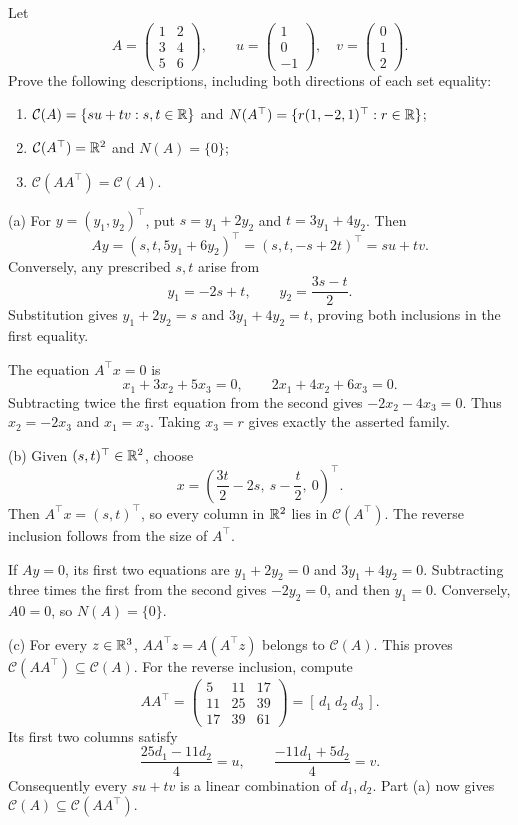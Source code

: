 \begin{problem}\label{ex:01:concrete-column-null-sets}
Let
\[
A=\begin{pmatrix}1&2\\3&4\\5&6\end{pmatrix},
\qquad
u=\begin{pmatrix}1\\0\\-1\end{pmatrix},
\quad v=\begin{pmatrix}0\\1\\2\end{pmatrix}.
\]
Prove the following descriptions, including both directions of each
set equality:
\begin{enumerate}
\item $\mathcal C(A)=\{su+tv:s,t\in\mathbb R\}$ and
$N(A^\top)=\{r(1,-2,1)^\top:r\in\mathbb R\}$;
\item $\mathcal C(A^\top)=\mathbb R^2$ and $N(A)=\{0\}$;
\item $\mathcal C(AA^\top)=\mathcal C(A)$.
\end{enumerate}
\end{problem}
\begin{solution}
(a) For $y=(y_1,y_2)^\top$, put
$s=y_1+2y_2$ and $t=3y_1+4y_2$. Then
\[
Ay=(s,t,5y_1+6y_2)^\top=(s,t,-s+2t)^\top=su+tv.
\]
Conversely, any prescribed $s,t$ arise from
\[
y_1=-2s+t,\qquad y_2=\frac{3s-t}{2}.
\]
Substitution gives $y_1+2y_2=s$ and $3y_1+4y_2=t$, proving both
inclusions in the first equality.

The equation $A^\top x=0$ is
\[
x_1+3x_2+5x_3=0,\qquad 2x_1+4x_2+6x_3=0.
\]
Subtracting twice the first equation from the second gives
$-2x_2-4x_3=0$. Thus $x_2=-2x_3$ and $x_1=x_3$.
Taking $x_3=r$ gives exactly the asserted family.

(b) Given $(s,t)^\top\in\mathbb R^2$, choose
\[
x=\left(\frac{3t}{2}-2s,\ s-\frac t2,\ 0\right)^\top.
\]
Then $A^\top x=(s,t)^\top$, so every column in $\mathbb R^2$ lies in
$\mathcal C(A^\top)$. The reverse inclusion follows from the size of $A^\top$.

If $Ay=0$, its first two equations are
$y_1+2y_2=0$ and $3y_1+4y_2=0$. Subtracting three times the first
from the second gives $-2y_2=0$, and then $y_1=0$.
Conversely, $A0=0$, so $N(A)=\{0\}$.

(c) For every $z\in\mathbb R^3$, $AA^\top z=A(A^\top z)$ belongs to $\mathcal C(A)$.
This proves $\mathcal C(AA^\top)\subseteq \mathcal C(A)$.
For the reverse inclusion, compute
\[
AA^\top=\begin{pmatrix}5&11&17\\11&25&39\\17&39&61\end{pmatrix}
=[\,d_1\ d_2\ d_3\,].
\]
Its first two columns satisfy
\[
\frac{25d_1-11d_2}{4}=u,\qquad
\frac{-11d_1+5d_2}{4}=v.
\]
Consequently every $su+tv$ is a linear combination of $d_1,d_2$.
Part (a) now gives $\mathcal C(A)\subseteq \mathcal C(AA^\top)$.
\end{solution}

